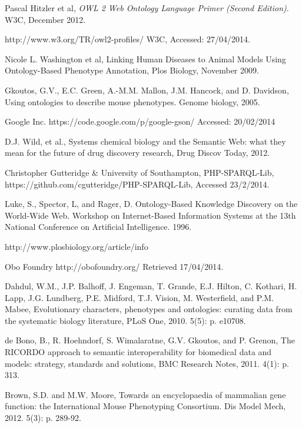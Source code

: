 \documentclass{article}
\begin{document}
\begin{thebibliography}{9}
  Pascal Hitzler et al,
  \emph{OWL 2 Web Ontology Language Primer (Second Edition)}.
  W3C,
  December 2012.

  http://www.w3.org/TR/owl2-profiles/
  W3C,
  Accessed: 27/04/2014.

  Nicole L. Washington et al,
  Linking Human Diseases to Animal Models Using Ontology-Based Phenotype Annotation,
  Plos Biology,
  November 2009.

  Gkoutos, G.V., E.C. Green, A.-M.M. Mallon, J.M. Hancock, and D. Davidson,
  Using ontologies to describe mouse phenotypes. 
  Genome biology, 
  2005.

  Google Inc.
  https://code.google.com/p/google-gson/
  Accessed: 20/02/2014

  D.J. Wild, et al.,
  Systems chemical biology and the Semantic Web: what they mean for the future of drug discovery research,
  Drug Discov Today,
  2012.

  Christopher Gutteridge & University of Southampton,
  PHP-SPARQL-Lib,
  https://github.com/cgutteridge/PHP-SPARQL-Lib,
  Accessed 23/2/2014.

  Luke, S., Spector, L, and Rager, D. 
  Ontology-Based Knowledge Discovery on the World-Wide Web. 
  Workshop on Internet-Based Information Systems at the 13th National Conference on Artificial Intelligence. 
  1996.

http://www.plosbiology.org/article/info%

  Obo Foundry
  http://obofoundry.org/
  Retrieved 17/04/2014.

  Dahdul, W.M., J.P. Balhoff, J. Engeman, T. Grande, E.J. Hilton, C. Kothari, H. Lapp, J.G. Lundberg, P.E. Midford, T.J. Vision, M. Westerfield, and P.M. Mabee, 
  Evolutionary characters, phenotypes and ontologies: curating data from the systematic biology literature,
  PLoS One,
  2010. 5(5): p. e10708.

  de Bono, B., R. Hoehndorf, S. Wimalaratne, G.V. Gkoutos, and P. Grenon, 
  The RICORDO approach to semantic interoperability for biomedical data and models: strategy, standards
and solutions, 
  BMC Research Notes, 
  2011. 4(1): p. 313.

  Brown, S.D. and M.W. Moore,
  Towards an encyclopaedia of mammalian gene function: the International Mouse Phenotyping Consortium. 
  Dis Model Mech, 
  2012. 5(3): p. 289-92.


\end{thebibliography}
\end{document}
